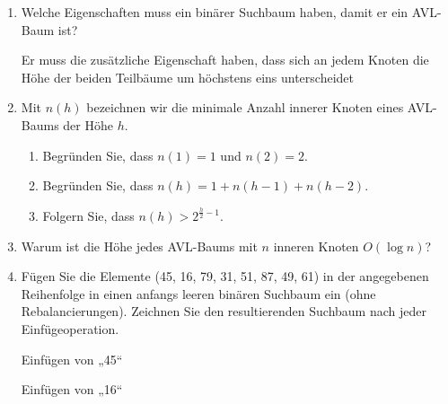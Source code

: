 \documentclass{bschlangaul-aufgabe}
\begin{document}
\begin{enumerate}

\item Welche Eigenschaften muss ein binärer Suchbaum haben, damit er ein
AVL-Baum ist?

\begin{bAntwort}
Er muss die zusätzliche Eigenschaft haben, dass sich an jedem Knoten die
Höhe der beiden Teilbäume um höchstens eins unterscheidet
\end{bAntwort}

\item Mit $n(h)$ bezeichnen wir die minimale Anzahl innerer Knoten eines
AVL-Baums der Höhe $h$.

\begin{enumerate}

\item Begründen Sie, dass $n(1) = 1$ und $n(2) = 2$.


\item Begründen Sie, dass $n(h) = 1 + n(h - 1) + n (h - 2)$.


\item Folgern Sie, dass $n(h) > 2^{\frac{h}{2}-1}$.
\end{enumerate}

\item Warum ist die Höhe jedes AVL-Baums mit $n$ inneren Knoten $O(\log n)$?

\item Fügen Sie die Elemente (45, 16, 79, 31, 51, 87, 49, 61) in der
angegebenen Reihenfolge in einen anfangs leeren binären Suchbaum ein
(ohne Rebalancierungen). Zeichnen Sie den resultierenden Suchbaum nach
jeder Einfügeoperation.

\begin{bAntwort}
\begin{multicols}{2}
\begin{bBaum}{Einfügen von „45“}
\end{bBaum}

\begin{bBaum}{Einfügen von „16“}
\end{bBaum}


\end{multicols}
\end{bAntwort}
\end{enumerate}
\end{document}

